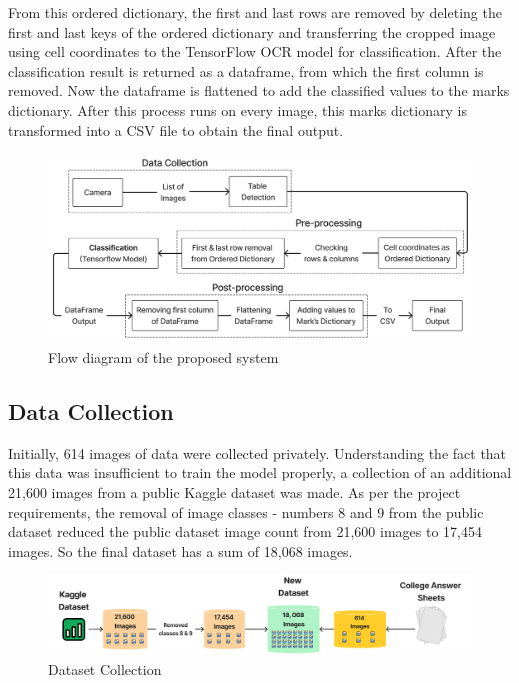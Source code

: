 \vspace{2 mm}

\noindent From this ordered dictionary, the first and last rows are removed by deleting the first and last keys of the ordered dictionary and transferring the cropped image using cell coordinates to the TensorFlow OCR model for classification. After the classification result is returned as a dataframe, from which the first column is removed. Now the dataframe is flattened to add the classified values to the marks dictionary. After this process runs on every image, this marks dictionary is transformed into a CSV file to obtain the final output.

\vspace{1 cm}

\begin{figure}[h!]
    \centering
    \includegraphics[width=\textwidth]{Images/Block_Diag/Flow_Diagram.jpg}
    \caption{Flow diagram of the proposed system}
\end{figure}

\clearpage

\subsection{Data Collection}

\noindent Initially, 614 images of data were collected privately. Understanding the fact that this data was insufficient to train the model properly, a collection of an additional 21,600 images from a public Kaggle dataset was made. As per the project requirements, the removal of image classes - numbers 8 and 9 from the public dataset reduced the public dataset image count from 21,600 images to 17,454 images. So the final dataset has a sum of 18,068 images.

\begin{figure}[h!]
    \centering
    \includegraphics[width=\textwidth]
    {Images/Block_Diag/Dataset_Counts.png}
    \caption{Dataset Collection}
\end{figure}

